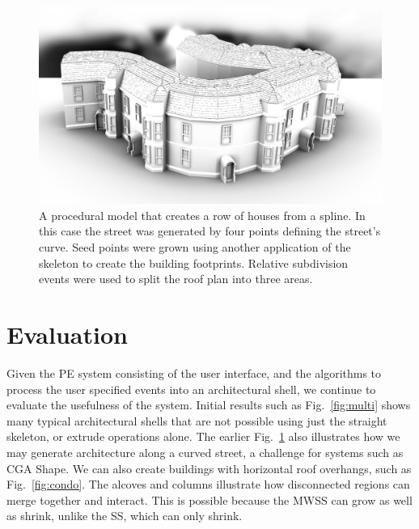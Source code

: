 \begin{figure}
  \centering
  \includegraphics[width=1.0\columnwidth]{CurvedBuildingFront.png}
  \caption[An example of subdivision events for roofs]{\label{fig:kensington}
 A procedural model that creates a row of houses from a spline. In this case the street was generated by four points defining the street's curve. Seed points were grown using another application of the skeleton to create the building footprints. Relative subdivision events were used to split the roof plan into three areas.}
\end{figure}


\section{Evaluation}
\label{Sec:Evaluation}

Given the PE system consisting of the user interface, and the algorithms to process the user specified events into an architectural shell, we continue to evaluate the usefulness of the system. Initial results such as Fig.~\ref{fig:multi} shows many typical architectural shells that are not possible using just the straight skeleton, or extrude operations alone. The earlier Fig.~\ref{fig:kensington} also illustrates how we may generate architecture along a curved street, a challenge for systems such as CGA Shape. We can also create buildings with horizontal roof overhangs, such as Fig.~\ref{fig:condo}. The alcoves and columns illustrate how disconnected regions can merge together and interact. This is possible because the MWSS can grow as well as shrink, unlike the SS, which can only shrink. 



